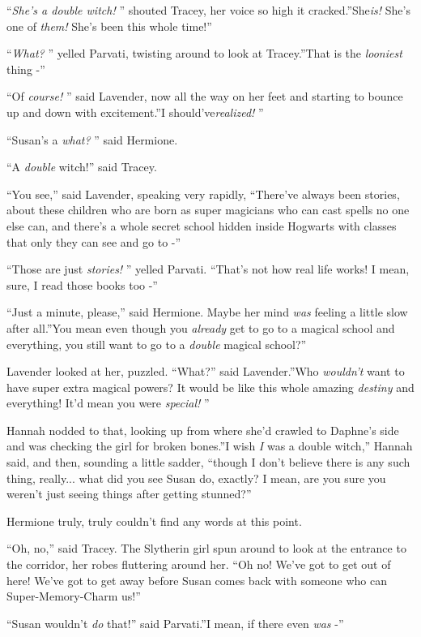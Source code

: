 ``\emph{She's a double witch!} '' shouted Tracey, her voice so high it
cracked.''She\emph{is!} She's one of \emph{them!} She's been this whole
time!''

``\emph{What?} '' yelled Parvati, twisting around to look at Tracey.''That
is the \emph{looniest} thing -''

``Of \emph{course!} '' said Lavender, now all the way on her feet and
starting to bounce up and down with excitement.''I
should've\emph{realized!} ''

``Susan's a \emph{what?} '' said Hermione.

``A \emph{double} witch!'' said Tracey.

``You see,'' said Lavender, speaking very rapidly, ``There've always
been stories, about these children who are born as super magicians who
can cast spells no one else can, and there's a whole secret school
hidden inside Hogwarts with classes that only they can see and go to -''

``Those are just \emph{stories!} '' yelled Parvati. ``That's not how real
life works! I mean, sure, I read those books too -''

``Just a minute, please,'' said Hermione. Maybe her mind \emph{was}
feeling a little slow after all.''You mean even though you
\emph{already} get to go to a magical school and everything, you still
want to go to a \emph{double} magical school?''

Lavender looked at her, puzzled. ``What?'' said Lavender.''Who
\emph{wouldn't} want to have super extra magical powers? It would be
like this whole amazing \emph{destiny} and everything! It'd mean you
were \emph{special!} ''

Hannah nodded to that, looking up from where she'd crawled to Daphne's
side and was checking the girl for broken bones.''I wish \emph{I} was a
double witch,'' Hannah said, and then, sounding a little sadder,
``though I don't believe there is any such thing, really... what
did you see Susan do, exactly? I mean, are you sure you weren't just
seeing things after getting stunned?''

Hermione truly, truly couldn't find any words at this point.

``Oh, no,'' said Tracey. The Slytherin girl spun around to look at the
entrance to the corridor, her robes fluttering around her. ``Oh no!
We've got to get out of here! We've got to get away before Susan comes
back with someone who can Super-Memory-Charm us!''

``Susan wouldn't \emph{do} that!'' said Parvati.''I mean, if there even
\emph{was} -''

